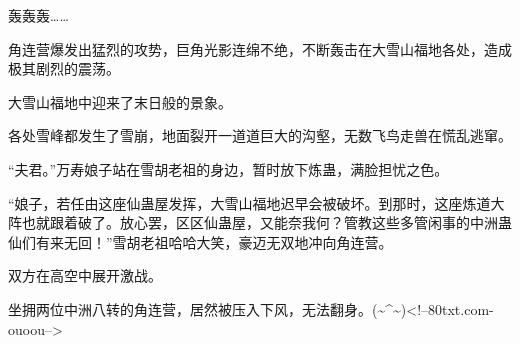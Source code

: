 \begin{this_body}
轰轰轰……

角连营爆发出猛烈的攻势，巨角光影连绵不绝，不断轰击在大雪山福地各处，造成极其剧烈的震荡。

大雪山福地中迎来了末日般的景象。

各处雪峰都发生了雪崩，地面裂开一道道巨大的沟壑，无数飞鸟走兽在慌乱逃窜。

“夫君。”万寿娘子站在雪胡老祖的身边，暂时放下炼蛊，满脸担忧之色。

“娘子，若任由这座仙蛊屋发挥，大雪山福地迟早会被破坏。到那时，这座炼道大阵也就跟着破了。放心罢，区区仙蛊屋，又能奈我何？管教这些多管闲事的中洲蛊仙们有来无回！”雪胡老祖哈哈大笑，豪迈无双地冲向角连营。

双方在高空中展开激战。

坐拥两位中洲八转的角连营，居然被压入下风，无法翻身。(\~{}\^{}\~{})<!--80txt.com-ouoou-->

\end{this_body}

